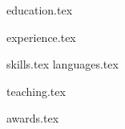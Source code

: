 \documentclass[letterpaper,11pt]{article}
\begin{document}


{education.tex}

{experience.tex}

\sidebyside
    {{skills.tex}}
    {{languages.tex}}

{teaching.tex}

{awards.tex}
\end{document}
